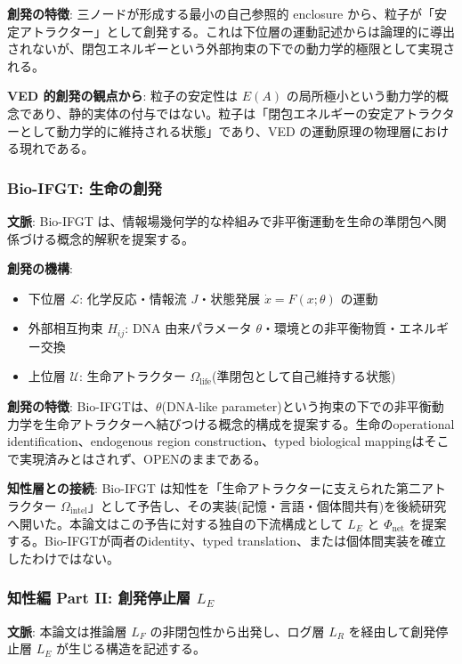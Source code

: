 \textbf{創発の特徴}:
三ノードが形成する最小の自己参照的 enclosure から、粒子が「安定アトラクター」として創発する。これは下位層の運動記述からは論理的に導出されないが、閉包エネルギーという外部拘束の下での動力学的極限として実現される。

\textbf{VED 的創発の観点から}:
粒子の安定性は $E(A)$ の局所極小という動力学的概念であり、静的実体の付与ではない。粒子は「閉包エネルギーの安定アトラクターとして動力学的に維持される状態」であり、VED の運動原理の物理層における現れである。

\subsubsection{Bio-IFGT: 生命の創発}


\textbf{文脈}: Bio-IFGT は、情報場幾何学的な枠組みで非平衡運動を生命の準閉包へ関係づける概念的解釈を提案する。

\textbf{創発の機構}:
\begin{itemize}
\item 下位層 $\mathcal{L}$: 化学反応・情報流 $J$・状態発展 $\dot{x} = F(x;\theta)$ の運動
\item 外部相互拘束 $H_{ij}$: DNA 由来パラメータ $\theta$・環境との非平衡物質・エネルギー交換
\item 上位層 $\mathcal{U}$: 生命アトラクター $\Omega_{\text{life}}$(準閉包として自己維持する状態)
\end{itemize}


\textbf{創発の特徴}:
Bio-IFGTは、$\theta$(DNA-like parameter)という拘束の下での非平衡動力学を生命アトラクターへ結びつける概念的構成を提案する。生命のoperational identification、endogenous region construction、typed biological mappingはそこで実現済みとはされず、OPENのままである。

\textbf{知性層との接続}:
Bio-IFGT は知性を「生命アトラクターに支えられた第二アトラクター $\Omega_{\text{intel}}$」として予告し、その実装(記憶・言語・個体間共有)を後続研究へ開いた。本論文はこの予告に対する独自の下流構成として $L_E$ と $\Phi_{\text{net}}$ を提案する。Bio-IFGTが両者のidentity、typed translation、または個体間実装を確立したわけではない。

\subsubsection{知性編 Part II: 創発停止層 $L_E$}


\textbf{文脈}: 本論文は推論層 $L_F$ の非閉包性から出発し、ログ層 $L_R$ を経由して創発停止層 $L_E$ が生じる構造を記述する。

